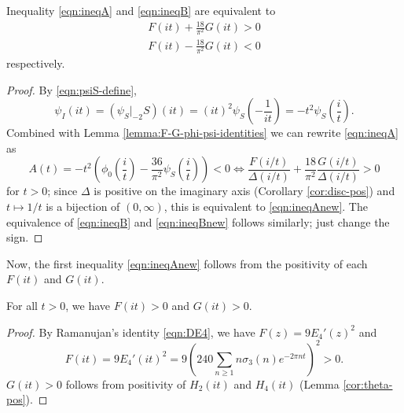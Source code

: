 \begin{lemma}\label{lemma:ineqABnew-equiv}\leanok
Inequality \eqref{eqn:ineqA} and \eqref{eqn:ineqB} are equivalent to
\begin{align}
    F(it) + \frac{18}{\pi^2} G(it) > 0 \label{eqn:ineqAnew} \\
    F(it) - \frac{18}{\pi^2} G(it) < 0 \label{eqn:ineqBnew}
\end{align}
respectively.
\end{lemma}
\begin{proof}
By \eqref{eqn:psiS-define},
\begin{equation}
    \psi_I(it) = (\psi_S|_{-2}S)(it) = (it)^{2}\psi_S\left(-\frac{1}{it}\right) = -t^2 \psi_S\left(\frac{i}{t}\right).
\end{equation}
Combined with Lemma \ref{lemma:F-G-phi-psi-identities} we can rewrite \eqref{eqn:ineqA} as
\begin{equation}
    A(t) = -t^2 \left(\phi_0\left(\frac{i}{t}\right) - \frac{36}{\pi^2} \psi_S\left(\frac{i}{t}\right)\right) < 0 \Leftrightarrow \frac{F(i/t)}{\Delta(i/t)} + \frac{18}{\pi^2} \frac{G(i/t)}{\Delta(i/t)} > 0
\end{equation}
for $t > 0$; since $\Delta$ is positive on the imaginary axis (Corollary \ref{cor:disc-pos}) and $t \mapsto 1/t$ is a bijection of $(0, \infty)$, this is equivalent to \eqref{eqn:ineqAnew}.
The equivalence of \eqref{eqn:ineqB} and \eqref{eqn:ineqBnew} follows similarly; just change the sign.
\end{proof}


Now, the first inequality \eqref{eqn:ineqAnew} follows from the positivity of each $F(it)$ and $G(it)$.

\begin{lemma}\label{lemma:F-G-pos}\leanok
For all $t > 0$, we have $F(it) > 0$ and $G(it) > 0$.
\end{lemma}
\begin{proof}\leanok
By Ramanujan's identity \eqref{eqn:DE4}, we have $F(z) = 9 E_4'(z)^2$ and
\begin{equation}
    F(it) = 9E_4'(it)^2 = 9 \left(240\sum_{n \geq 1} n \sigma_3(n) e^{-2 \pi n t} \right)^{2} > 0.
\end{equation}
$G(it) > 0$ follows from positivity of $H_2(it)$ and $H_4(it)$ (Lemma \ref{cor:theta-pos}).
\end{proof}

